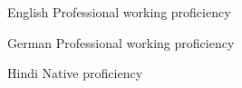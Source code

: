 
\begin{cventries}

  \cventry
    {English} %
    {Professional working proficiency}
    {}
    {}
    {}

  \cventry
    {German} %
    {Professional working proficiency}
    {}
    {}
    {}
	
	
  \cventry
    {Hindi} %
    {Native proficiency}
    {}
    {}
    {}
    
\end{cventries}
